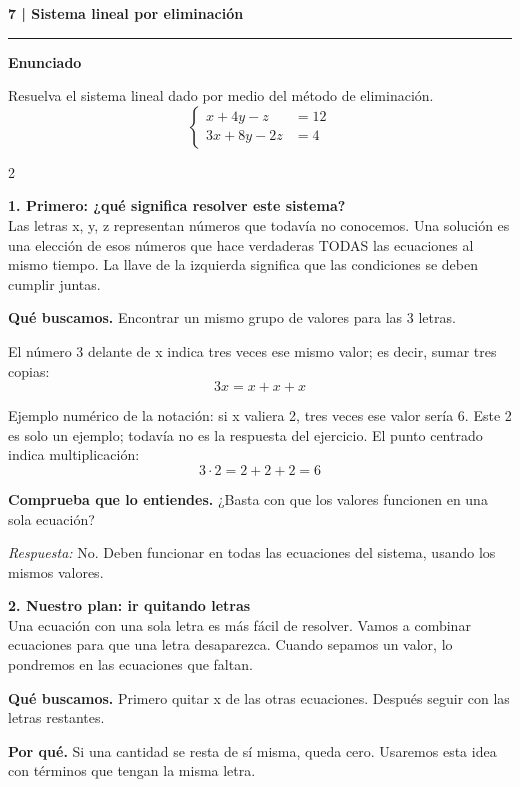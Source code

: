 \documentclass[11pt,a4paper,landscape]{article}
\newcommand{\titulo}[1]{{\LARGE\bfseries #1}\par\smallskip\hrule\medskip}
\begin{document}
\newpage{}\hypertarget{1.1-7}{}
\titulo{7 | Sistema lineal por eliminación}
\textbf{Enunciado}\par Resuelva el sistema lineal dado por medio del método de eliminación.
\[\left\{\begin{aligned}x + 4y - z &= 12\\3x + 8y - 2z &= 4\end{aligned}\right.\]
\begin{multicols*}{2}
\noindent\begin{minipage}{\linewidth}\textbf{1. Primero: ¿qué significa resolver este sistema?}\\[2pt]Las letras x, y, z representan números que todavía no conocemos. Una solución es una elección de esos números que hace verdaderas TODAS las ecuaciones al mismo tiempo. La llave de la izquierda significa que las condiciones se deben cumplir juntas.
\par\smallskip\textbf{Qué buscamos.} Encontrar un mismo grupo de valores para las 3 letras.
\par\smallskip El número 3 delante de x indica tres veces ese mismo valor; es decir, sumar tres copias:
\[3x=x+x+x\]
\par\smallskip Ejemplo numérico de la notación: si x valiera 2, tres veces ese valor sería 6. Este 2 es solo un ejemplo; todavía no es la respuesta del ejercicio. El punto centrado indica multiplicación:
\[3\cdot 2=2+2+2=6\]
\par\smallskip\textbf{Comprueba que lo entiendes.} ¿Basta con que los valores funcionen en una sola ecuación?\par\textit{Respuesta:} No. Deben funcionar en todas las ecuaciones del sistema, usando los mismos valores.
\end{minipage}\par\medskip
\noindent\begin{minipage}{\linewidth}\textbf{2. Nuestro plan: ir quitando letras}\\[2pt]Una ecuación con una sola letra es más fácil de resolver. Vamos a combinar ecuaciones para que una letra desaparezca. Cuando sepamos un valor, lo pondremos en las ecuaciones que faltan.
\par\smallskip\textbf{Qué buscamos.} Primero quitar x de las otras ecuaciones. Después seguir con las letras restantes.
\par\smallskip\textbf{Por qué.} Si una cantidad se resta de sí misma, queda cero. Usaremos esta idea con términos que tengan la misma letra.

\end{minipage}
\end{multicols*}
\end{document}
